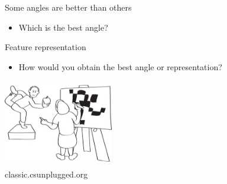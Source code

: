 \documentclass[aspectratio=169,14pt,usenames,dvipsnames]{beamer}
\begin{document}
\begin{frame}[t]{Some angles are better than others}
	\begin{itemize}
		\item Which is the best angle?  \break \break \break \break \break
	\end{itemize}
\end{frame}
		
\begin{frame}{Feature representation}
\begin{itemize}
\item How would you obtain the best angle or representation?
\end{itemize}
\centering
\includegraphics[width=4.8cm , height=3.8cm]{Images/AIML_FD_IMG16.png}\\

\tiny classic.csunplugged.org
\end{frame}
\end{document}
